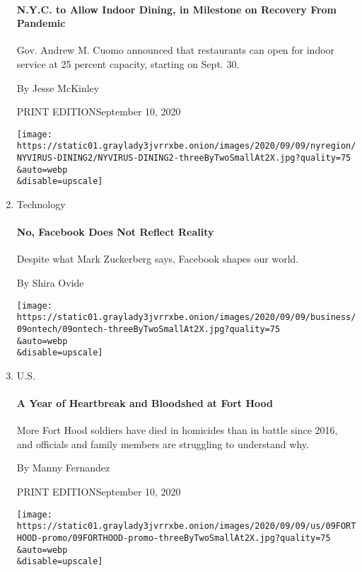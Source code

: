\begin{enumerate}
  \href{/2020/09/09/nyregion/indoor-dining-coronavirus.html?searchResultPosition=8}{}

  \hypertarget{nyc-to-allow-indoor-dining-in-milestone-on-recovery-from-pandemic}{%
  \paragraph{N.Y.C. to Allow Indoor Dining, in Milestone on Recovery
  From
  Pandemic}\label{nyc-to-allow-indoor-dining-in-milestone-on-recovery-from-pandemic}}

  Gov. Andrew M. Cuomo announced that restaurants can open for indoor
  service at 25 percent capacity, starting on Sept. 30.

  By Jesse McKinley

  PRINT EDITIONSeptember 10, 2020

  \texttt{[image: https://static01.graylady3jvrrxbe.onion/images/2020/09/09/nyregion/NYVIRUS-DINING2/NYVIRUS-DINING2-threeByTwoSmallAt2X.jpg?quality=75\\\&auto=webp\\\&disable=upscale]}
\item
  Technology

  \href{/2020/09/09/technology/facebook-mark-zuckerberg.html?searchResultPosition=9}{}

  \hypertarget{no-facebook-does-not-reflect-reality}{%
  \paragraph{No, Facebook Does Not Reflect
  Reality}\label{no-facebook-does-not-reflect-reality}}

  Despite what Mark Zuckerberg says, Facebook shapes our world.

  By Shira Ovide

  \texttt{[image: https://static01.graylady3jvrrxbe.onion/images/2020/09/09/business/09ontech/09ontech-threeByTwoSmallAt2X.jpg?quality=75\\\&auto=webp\\\&disable=upscale]}
\item
  U.S.

  \href{/2020/09/09/us/fort-hood-deaths-army.html?searchResultPosition=10}{}

  \hypertarget{a-year-of-heartbreak-and-bloodshed-at-fort-hood}{%
  \paragraph{A Year of Heartbreak and Bloodshed at Fort
  Hood}\label{a-year-of-heartbreak-and-bloodshed-at-fort-hood}}

  More Fort Hood soldiers have died in homicides than in battle since
  2016, and officials and family members are struggling to understand
  why.

  By Manny Fernandez

  PRINT EDITIONSeptember 10, 2020

  \texttt{[image: https://static01.graylady3jvrrxbe.onion/images/2020/09/09/us/09FORTHOOD-promo/09FORTHOOD-promo-threeByTwoSmallAt2X.jpg?quality=75\\\&auto=webp\\\&disable=upscale]}
\end{enumerate}

